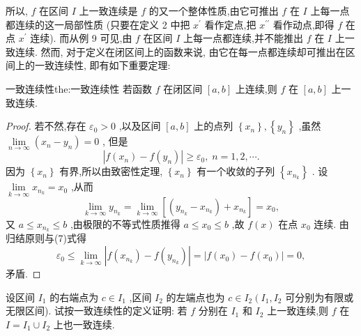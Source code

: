 所以, \(f\) 在区间 \(I\) 上一致连续是 \(f\) 的又一个整体性质,由它可推出 \(f\) 在 \(I\) 上每一点都连续的这一局部性质 (只要在定义 2 中把 \({x}^{\prime }\) 看作定点,把 \({x}^{\prime \prime }\) 看作动点,即得 \(f\) 在点 \({x}^{\prime }\) 连续). 而从例 9 可见,由 \(f\) 在区间 \(I\) 上每一点都连续,并不能推出 \(f\) 在 \(I\) 上一致连续. 然而, 对于定义在闭区间上的函数来说, 由它在每一点都连续却可推出在区间上的一致连续性, 即有如下重要定理:

\begin{theorem}{一致连续性}{the:一致连续性}
若函数 \(f\) 在闭区间 \(\left\lbrack  {a,b}\right\rbrack\) 上连续,则 \(f\) 在 \(\left\lbrack  {a,b}\right\rbrack\) 上一致连续.
\end{theorem}

\begin{proof}
若不然,存在 \({\varepsilon }_{0} > 0\) ,以及区间 \(\left\lbrack  {a,b}\right\rbrack\) 上的点列 \(\left\{  {x}_{n}\right\}  ,\left\{  {y}_{n}\right\}\) ,虽然 \(\mathop{\lim }\limits_{{n \rightarrow  \infty }}\left( {{x}_{n} - {y}_{n}}\right)  = 0\) , 但是
\[
\left| {f\left( {x}_{n}\right)  - f\left( {y}_{n}\right) }\right|  \geq  {\varepsilon }_{0},\;n = 1,2,\cdots . \tag{7}
\]
因为 \(\left\{  {x}_{n}\right\}\) 有界,所以由致密性定理, \(\left\{  {x}_{n}\right\}\) 有一个收敛的子列 \(\left\{  {x}_{{n}_{k}}\right\}\) . 设 \(\mathop{\lim }\limits_{{k \rightarrow  \infty }}{x}_{{n}_{k}} = {x}_{0}\) ,从而
\[
\mathop{\lim }\limits_{{k \rightarrow  \infty }}{y}_{{n}_{k}} = \mathop{\lim }\limits_{{k \rightarrow  \infty }}\left\lbrack  {\left( {{y}_{{n}_{k}} - {x}_{{n}_{k}}}\right)  + {x}_{{n}_{k}}}\right\rbrack   = {x}_{0},
\]
又 \(a \leq  {x}_{{n}_{k}} \leq  b\) ,由极限的不等式性质推得 \(a \leq  {x}_{0} \leq  b\) ,故 \(f\left( x\right)\) 在点 \({x}_{0}\) 连续. 由归结原则与(7)式得
\[
{\varepsilon }_{0} \leq  \mathop{\lim }\limits_{{k \rightarrow  \infty }}\left| {f\left( {x}_{{n}_{k}}\right)  - f\left( {y}_{{n}_{k}}\right) }\right|  = \left| {f\left( {x}_{0}\right)  - f\left( {x}_{0}\right) }\right|  = 0,
\]
矛盾.
\end{proof}


\begin{example}
设区间 \({I}_{1}\) 的右端点为 \(c \in  {I}_{1}\) ,区间 \({I}_{2}\) 的左端点也为 \(c \in  {I}_{2}\left( {{I}_{1},{I}_{2}}\right.\) 可分别为有限或无限区间). 试按一致连续性的定义证明: 若 \(f\) 分别在 \({I}_{1}\) 和 \({I}_{2}\) 上一致连续,则 \(f\) 在 \(I = {I}_{1} \cup  {I}_{2}\) 上也一致连续.
\end{example}


